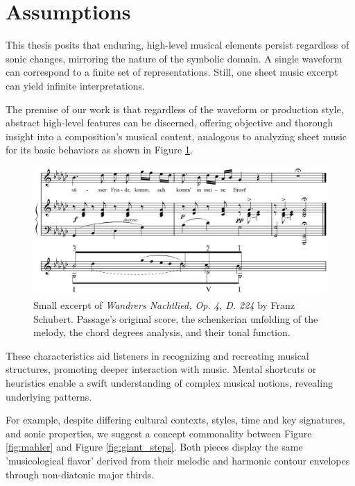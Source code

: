 \section{Assumptions}

This thesis posits that enduring, high-level musical elements persist regardless of sonic changes, mirroring the nature of the symbolic domain. A single waveform can correspond to a finite set of representations. Still, one sheet music excerpt can yield infinite interpretations.

The premise of our work is that regardless of the waveform or production style, abstract high-level features can be discerned, offering objective and thorough insight into a composition's musical content, analogous to analyzing sheet music for its basic behaviors as shown in Figure \ref{fig:Wandrers Nachtlied, Op. 4, D. 224}.


\begin{figure}[ht]
\includegraphics[clip,width=\columnwidth]{figures/schenkerian analysis/SchubertOp4no3.png}%
\caption[Excerpt of \textit{Wandrers Nachtlied, Op. 4, D. 224} by Franz Schubert.]{\small{Small excerpt of \textit{Wandrers Nachtlied, Op. 4, D. 224} by Franz Schubert. Passage's original score, the schenkerian unfolding of the melody, the chord degrees analysis, and their tonal function.}}
\label{fig:Wandrers Nachtlied, Op. 4, D. 224}
\end{figure}


These characteristics aid listeners in recognizing and recreating musical structures, promoting deeper interaction with music. Mental shortcuts or heuristics enable a swift understanding of complex musical notions, revealing underlying patterns.

For example, despite differing cultural contexts, styles, time and key signatures, and sonic properties, we suggest a concept commonality between Figure \ref{fig:mahler} and Figure \ref{fig:giant_steps}. Both pieces display the same 'musicological flavor' derived from their melodic and harmonic contour envelopes through non-diatonic major thirds.

